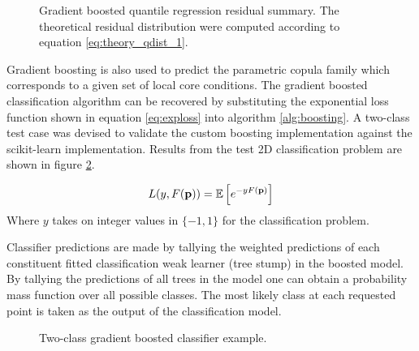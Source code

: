 \begin{figure}[H]%
    \centering
    \qquad
    \qquad
    \qquad
    \qquad
    \caption[Gradient boosted quantile regression residual summary.]{Gradient boosted quantile regression residual summary.  The theoretical residual distribution were computed according to equation \ref{eq:theory_qdist_1}.} %
    \label{fig:gb2}%
\end{figure}

Gradient boosting is also used to predict the parametric copula family which corresponds to a given set of local core conditions.  The gradient boosted classification algorithm can be recovered by substituting the exponential loss function shown in equation \ref{eq:exploss} into algorithm \ref{alg:boosting}.   A two-class test case was devised to validate the custom boosting implementation against the scikit-learn implementation.  Results from the test 2D classification problem are shown in figure \ref{fig:gb3}.  

\begin{equation}
L(y, F(\mathbf p)) = \operatorname*{\mathbb{E}} \left[ e^{-yF(\mathbf p)}\right] 
\label{eq:exploss}
\end{equation} 
Where $y$ takes on integer values in $\{-1, 1\}$ for the classification problem.

Classifier predictions are made by tallying the weighted predictions of each constituent fitted classification weak learner (tree stump) in the boosted model.  By tallying the predictions of all trees in the model one can obtain a probability mass function over all possible classes.  The most likely class at each requested point is taken as the output of the classification model.

\begin{figure}[H]%
    \centering
    \qquad
    \caption[]{Two-class gradient boosted classifier example.}%
    \label{fig:gb3}%
\end{figure}

